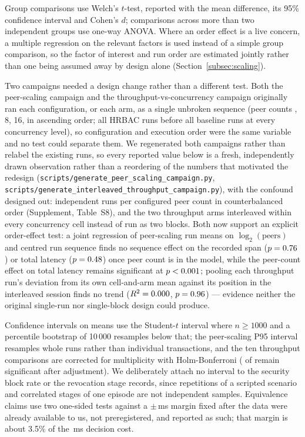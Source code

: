 \documentclass[a4paper,fleqn]{cas-sc}
\begin{document}
Group comparisons use Welch's $t$-test, reported with the mean difference,
its 95\% confidence interval and Cohen's $d$; comparisons across more than
two independent groups use one-way ANOVA. Where an order effect is a live
concern, a multiple regression on the relevant factors is used instead of a
simple group comparison, so the factor of interest and run order are
estimated jointly rather than one being assumed away by design alone
(Section~\ref{subsec:scaling}).

Two campaigns needed a design change rather than a different test. Both the
peer-scaling campaign and the throughput-vs-concurrency campaign
originally ran each configuration, or each arm, as a single unbroken
sequence (peer counts \ScaleMinPeers, 8, 16, \ScaleMaxPeers{} in ascending
order; all HRBAC runs before all baseline runs at every concurrency
level), so configuration and execution order were the same variable and
no test could separate them. We regenerated both campaigns rather than
relabel the existing runs, so every reported value below is a fresh,
independently drawn observation rather than a reordering of the numbers
that motivated the redesign
(\texttt{scripts/generate\_peer\_scaling\_campaign.py},
\texttt{scripts/generate\_interleaved\_throughput\_campaign.py}), with the
confound designed out: \PartRunsPerConfig{} independent runs per
configured peer count in counterbalanced order (Supplement, Table~S8),
and the two throughput arms interleaved within every concurrency cell
instead of run as two blocks. Both now support an explicit order-effect
test: a joint regression of peer-scaling run means on $\log_2(\text{peers})$
and centred run sequence finds no sequence effect on the recorded span
($p=0.76$) or total latency ($p=0.48$) once
peer count is in the model, while the peer-count effect on total latency
remains significant at $p<0.001$; pooling each throughput
run's deviation from its own cell-and-arm mean against its position in the
interleaved session finds no trend ($R^2=0.000$, $p=0.96$)
— evidence
neither the original single-run nor single-block design could produce.

Confidence intervals on means use the Student-$t$ interval where
$n \ge 1000$ and a percentile bootstrap of 10\,000 resamples below that;
the peer-scaling P95 interval resamples whole runs rather than individual
transactions, and the ten throughput comparisons are corrected for
multiplicity with Holm-Bonferroni (\OverheadHolmSig{} of \OverheadLevels{}
remain significant after adjustment). We deliberately attach no interval
to the security block rate or the revocation stage records, since
repetitions of a scripted scenario and correlated stages of one episode
are not independent samples. Equivalence claims use two one-sided tests
against a $\pm$\DecisionMargin\,ms margin fixed after the data were
already available to us, not preregistered, and reported as such; that
margin is about 3.5\% of the \DecisionMean\,ms decision cost.
\end{document}
